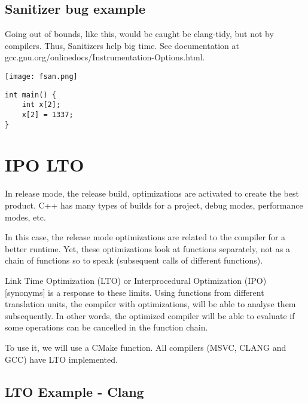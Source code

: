 \subsection{Sanitizer bug example}

Going out of bounds, like this, would be caught be clang-tidy, but not by compilers. Thus, Sanitizers help big time. See documentation at
gcc.gnu.org/onlinedocs/Instrumentation-Options.html.


\begin{center}
    \texttt{[image: fsan.png]}
\end{center}


\begin{verbatim}
int main() {
    int x[2];
    x[2] = 1337;
}
\end{verbatim}

\section{IPO LTO}

In release mode, the release build, optimizations are activated to create the best product. C++ has many types of builds
for a project, debug modes, performance modes, etc. 

In this case, the release mode optimizations are related to the compiler for a better runtime. Yet, these optimizations
look at functions separately, not as a chain of functions so to speak (subsequent calls of different functions).

Link Time Optimization (LTO) or Interprocedural Optimization (IPO) [synonyms] is a response to these limits. Using functions from different translation units, the compiler with optimizations,
will be able to analyse them subsequently. In other words, the optimized compiler will be able to evaluate
if some operations can be cancelled in the function chain.

To use it, we will use a CMake function. All compilers (MSVC, CLANG and GCC) have LTO implemented.


\subsection{LTO Example - Clang}

